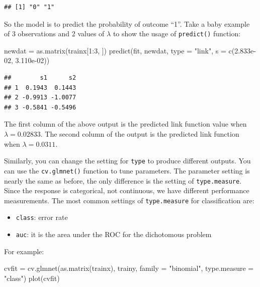 \documentclass[
  12pt,
]{krantz}
\makeatletter
\newenvironment{Shaded}{\begin{snugshade}}{\end{snugshade}}
\newcommand{\AttributeTok}[1]{\textcolor[rgb]{0.61,0.61,0.61}{#1}}
\newcommand{\DecValTok}[1]{\textcolor[rgb]{0.06,0.06,0.06}{#1}}
\newcommand{\FloatTok}[1]{\textcolor[rgb]{0.06,0.06,0.06}{#1}}
\newcommand{\FunctionTok}[1]{\textcolor[rgb]{0,0,0}{#1}}
\newcommand{\NormalTok}[1]{#1}
\newcommand{\OtherTok}[1]{\textcolor[rgb]{0.37,0.37,0.37}{#1}}
\newcommand{\SpecialCharTok}[1]{\textcolor[rgb]{0,0,0}{#1}}
\newcommand{\StringTok}[1]{\textcolor[rgb]{0.5,0.5,0.5}{#1}}
\providecommand{\tightlist}{%
  \setlength{\itemsep}{0pt}\setlength{\parskip}{0pt}}
\newenvironment{kframe}{%
\medskip{}
\setlength{\fboxsep}{.8em}
 \def\at@end@of@kframe{}%
 \ifinner\ifhmode%
  \def\at@end@of@kframe{\end{minipage}}%
  \begin{minipage}{\columnwidth}%
 \fi\fi%
 \def\FrameCommand##1{\hskip\@totalleftmargin \hskip-\fboxsep
 \colorbox{shadecolor}{##1}\hskip-\fboxsep
     \hskip-\linewidth \hskip-\@totalleftmargin \hskip\columnwidth}%
 \MakeFramed {\advance\hsize-\width
   \@totalleftmargin\z@ \linewidth\hsize
   \@setminipage}}%
 {\par\unskip\endMakeFramed%
 \at@end@of@kframe}
\renewenvironment{Shaded}{\begin{kframe}}{\end{kframe}}
\makeatother
\begin{document}
\begin{verbatim}
## [1] "0" "1"
\end{verbatim}

So the model is to predict the probability of outcome ``1''. Take a baby example of 3 observations and 2 values of \(\lambda\) to show the usage of \texttt{predict()} function:

\begin{Shaded}
\begin{Highlighting}[]
\NormalTok{newdat }\OtherTok{=} \FunctionTok{as.matrix}\NormalTok{(trainx[}\DecValTok{1}\SpecialCharTok{:}\DecValTok{3}\NormalTok{, ])}
\FunctionTok{predict}\NormalTok{(fit, newdat, }\AttributeTok{type =} \StringTok{"link"}\NormalTok{, }\AttributeTok{s =} \FunctionTok{c}\NormalTok{(}\FloatTok{2.833e{-}02}\NormalTok{, }\FloatTok{3.110e{-}02}\NormalTok{))}
\end{Highlighting}
\end{Shaded}

\begin{verbatim}
##        s1      s2
## 1  0.1943  0.1443
## 2 -0.9913 -1.0077
## 3 -0.5841 -0.5496
\end{verbatim}

The first column of the above output is the predicted link function value when \(\lambda = 0.02833\). The second column of the output is the predicted link function when \(\lambda = 0.0311\).

Similarly, you can change the setting for \texttt{type} to produce different outputs. You can use the \texttt{cv.glmnet()} function to tune parameters. The parameter setting is nearly the same as before, the only difference is the setting of \texttt{type.measure}. Since the response is categorical, not continuous, we have different performance measurements. The most common settings of \texttt{type.measure} for classification are:

\begin{itemize}
\tightlist
\item
  \texttt{class}: error rate
\item
  \texttt{auc}: it is the area under the ROC for the dichotomous problem
\end{itemize}

For example:

\begin{Shaded}
\begin{Highlighting}[]
\NormalTok{cvfit }\OtherTok{=} \FunctionTok{cv.glmnet}\NormalTok{(}\FunctionTok{as.matrix}\NormalTok{(trainx), trainy, }
                  \AttributeTok{family =} \StringTok{"binomial"}\NormalTok{, }\AttributeTok{type.measure =} \StringTok{"class"}\NormalTok{)}
\FunctionTok{plot}\NormalTok{(cvfit)}
\end{Highlighting}
\end{Shaded}
\end{document}
